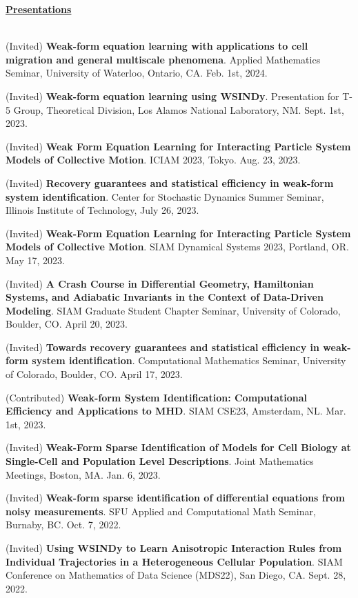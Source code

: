 \documentclass[letterpaper,11pt,oneside]{article}
\newcommand{\headr}[1]{\vspace{10pt}\uline{\Large{\textbf{#1}} \hfill } \\ \vspace{-10pt}\\}
\begin{document}
\headr{Presentations}
\vspace{-0.5cm}
\begin{enumerate}[label={[\arabic*]}]
\item (Invited) \textbf{Weak-form equation learning with applications to cell migration and general multiscale phenomena}. Applied Mathematics Seminar, University of Waterloo, Ontario, CA. Feb. 1st, 2024.
\item (Invited) \textbf{Weak-form equation learning using WSINDy}. Presentation for T-5 Group, Theoretical Division, Los Alamos National Laboratory, NM. Sept. 1st, 2023.
\item (Invited) \textbf{Weak Form Equation Learning for Interacting Particle System
Models of Collective Motion}. ICIAM 2023, Tokyo. Aug. 23, 2023.
\item (Invited) \textbf{Recovery guarantees and statistical efficiency in weak-form
system identification}. Center for Stochastic Dynamics Summer Seminar, Illinois Institute of Technology, July 26, 2023.
\item (Invited) \textbf{Weak-Form Equation Learning for Interacting Particle System Models of Collective Motion}. SIAM Dynamical Systems 2023, Portland, OR. May 17, 2023.
\item (Invited) \textbf{A Crash Course in Differential Geometry, Hamiltonian Systems, and Adiabatic Invariants in the Context of Data-Driven Modeling}. SIAM Graduate Student Chapter Seminar, University of Colorado, Boulder, CO. April 20, 2023.
\item (Invited) \textbf{Towards recovery guarantees and statistical efficiency in weak-form system identification}. Computational Mathematics Seminar, University of Colorado, Boulder, CO. April 17, 2023.
\item (Contributed) \textbf{Weak-form System Identification: Computational Efficiency and Applications to MHD}. SIAM CSE23, Amsterdam, NL. Mar. 1st, 2023.
\item (Invited) \textbf{Weak-Form Sparse Identification of Models for Cell Biology at Single-Cell and Population Level Descriptions}. Joint Mathematics Meetings, Boston, MA. Jan. 6, 2023.
\item (Invited) \textbf{Weak-form sparse identification of differential equations from noisy measurements}. SFU Applied and Computational Math Seminar, Burnaby, BC. Oct. 7, 2022.
\item (Invited) \textbf{Using WSINDy to Learn Anisotropic Interaction 
Rules from Individual Trajectories in a Heterogeneous Cellular Population}. SIAM Conference on Mathematics of Data Science (MDS22), San Diego, CA. Sept. 28, 2022.

\end{enumerate}
\end{document}
